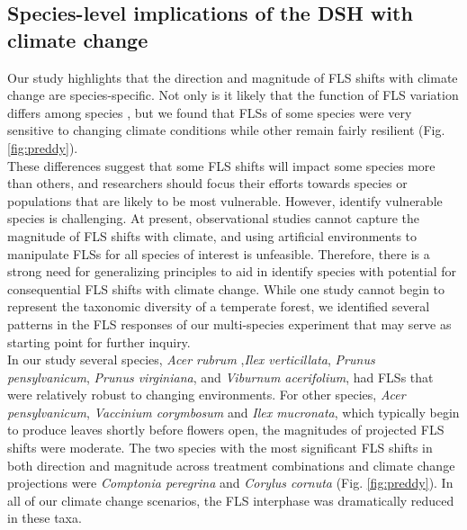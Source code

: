 \documentclass[11pt]{article}
\begin{document}
\subsection*{Species-level implications of the DSH with climate change}
\noindent  Our study highlights that the direction and magnitude of FLS shifts with climate change are species-specific. Not only is it likely that the function of FLS variation differs among species \citep{Buonaiuto2020}, but we found that FLSs of some species were very sensitive to changing climate conditions while other remain fairly resilient (Fig. \ref{fig:preddy}).\\

\noident These differences suggest that some FLS shifts will impact some species more than others, and researchers should focus their efforts towards species or populations that are likely to be most vulnerable. However, identify vulnerable species is challenging. At present, observational studies cannot capture the magnitude of FLS shifts with climate, and using artificial environments to manipulate FLSs for all species of interest is unfeasible. Therefore, there is a strong need for generalizing principles to aid in identify species with potential for consequential FLS shifts with climate change. While one study cannot begin to represent the taxonomic diversity of a temperate forest, we identified several patterns in the FLS responses of our multi-species experiment that may serve as starting point for further inquiry.\\

\noindent In our study several species, \textit{Acer rubrum} ,\textit{Ilex verticillata}, \textit{Prunus pensylvanicum}, \textit{Prunus virginiana}, and \textit{Viburnum acerifolium}, had FLSs that were relatively robust to changing environments. For other species, \textit{Acer pensylvanicum}, \textit{Vaccinium corymbosum} and \textit{Ilex mucronata}, which typically begin to produce leaves shortly before flowers open, the magnitudes of projected FLS shifts were moderate. The two species with the most significant FLS shifts in both direction and magnitude across treatment combinations and climate change projections were \textit{Comptonia peregrina} and \textit{Corylus cornuta} (Fig. \ref{fig:preddy}). In all of our climate change scenarios, the FLS interphase was dramatically reduced in these taxa.\\
 
\end{document}
